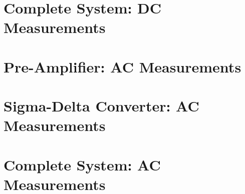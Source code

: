 \section{Complete System: DC Measurements}
\label{sec:systemDC}

\section{Pre-Amplifier: AC Measurements}
\label{sec:preAmpAC}

\section{Sigma-Delta Converter: AC Measurements}
\label{sec:sigdelAC}

\section{Complete System: AC Measurements}
\label{sec:systemAC}


